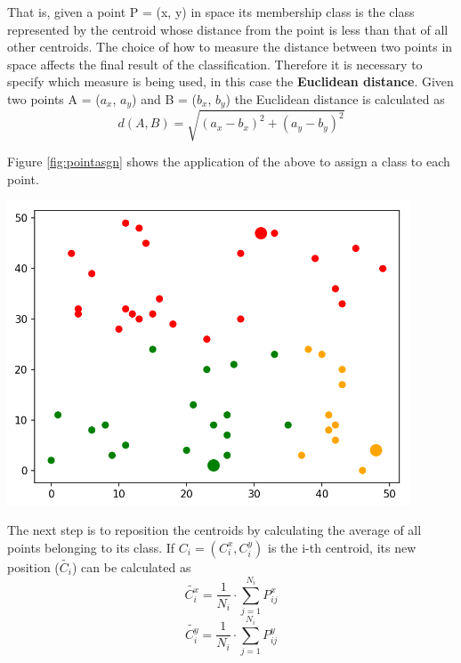 \documentclass{report}
\begin{document}
\begin{minipage}[b]{0.48\textwidth}
  That is, given a point P = (x, y) in space its membership class is the class represented by the centroid whose distance from the point is less than that of all other centroids. The choice of how to measure the distance between two points in space affects the final result of the classification. Therefore it is necessary to specify which measure is being used, in this case the \textbf{Euclidean distance}. Given two points A = ($a_x$, $a_y$) and B = ($b_x$, $b_y$) the Euclidean distance is calculated as
  \begin{equation}
      d(A, B) = \sqrt{(a_x - b_x)^2 + (a_y - b_y)^2}
  \end{equation}

  Figure \ref{fig:pointasgn} shows the application of the above to assign a class to each point.

  \begin{center}    
      \includegraphics[width = 0.9\textwidth]{imgs/asgnpoints.png}
      \label{fig:pointasgn}
  \end{center}

  The next step is to reposition the centroids by calculating the average of all points belonging to its class. If $C_i = (C_i^x, C_i^y)$ is the i-th centroid, its new position ($\tilde{C_i}$) can be calculated as
  \begin{equation}
      \tilde{C_i^x} = \frac{1}{N_i}\cdot \sum_{j = 1}^{N_i} P_{ij}^x
  \end{equation}
  \begin{equation}
      \tilde{C_i^y} = \frac{1}{N_i}\cdot \sum_{j = 1}^{N_i} P_{ij}^y
  \end{equation}


\end{minipage}
\end{document}
